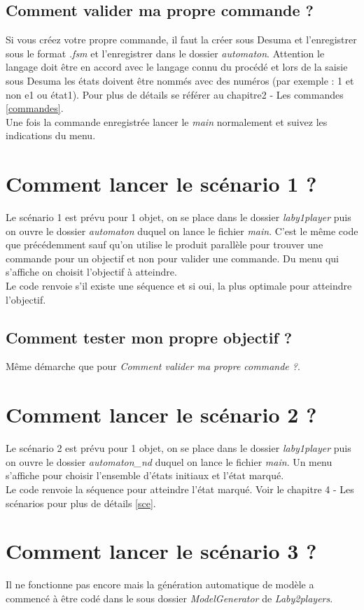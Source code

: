 \subsection{Comment valider ma propre commande ?}
Si vous créez votre propre commande, il faut la créer sous Desuma et l'enregistrer sous le format \emph{.fsm} et l'enregistrer dans le dossier \emph{automaton}. Attention le langage doit être en accord avec le langage connu du procédé et lors de la saisie sous Desuma les états doivent être nommés avec des numéros (par exemple : 1 et non e1 ou état1). Pour plus de détails se référer au chapitre2 - Les commandes \ref{commandes}.\\
Une fois la commande enregistrée lancer le \emph{main} normalement et suivez les indications du menu.


\section{Comment lancer le scénario 1 ?}
Le scénario 1 est prévu pour 1 objet, on se place dans le dossier \emph{laby1player} puis on ouvre le dossier \emph{automaton} duquel on lance le fichier \emph{main}. C'est le même code que précédemment sauf qu'on utilise le produit parallèle pour trouver une commande pour un objectif et non pour valider une commande. Du menu qui s'affiche on choisit l'objectif à atteindre.\\
Le code renvoie s'il existe une séquence et si oui, la plus optimale pour atteindre l'objectif.

\subsection{Comment tester mon propre objectif ?}
Même démarche que pour \textit{Comment valider ma propre commande ?}.

\section{Comment lancer le scénario 2 ?}
Le scénario 2 est prévu pour 1 objet, on se place dans le dossier \emph{laby1player} puis on ouvre le dossier \emph{automaton\_nd} duquel on lance le fichier \emph{main}. Un menu s'affiche pour choisir l'ensemble d'états initiaux et l'état marqué.\\
Le code renvoie la séquence pour atteindre l'état marqué. Voir le chapitre 4 - Les scénarios pour plus de détails \ref{sce}.

\section{Comment lancer le scénario 3 ?}
Il ne fonctionne pas encore mais la génération automatique de modèle a commencé à être codé dans le sous dossier \emph{ModelGenerator} de \emph{Laby2players}.